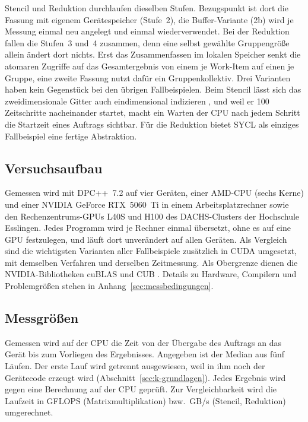 \documentclass[12pt,a4paper]{article}
\begin{document}
Stencil und Reduktion durchlaufen dieselben Stufen. Bezugspunkt ist dort die
Fassung mit eigenem Gerätespeicher (Stufe~2), die Buffer-Variante (2b) wird je
Messung einmal neu angelegt und einmal wiederverwendet. Bei der Reduktion fallen
die Stufen~3 und~4 zusammen, denn eine selbst gewählte Gruppengröße allein
ändert dort nichts. Erst das Zusammenfassen im lokalen Speicher senkt die
atomaren Zugriffe auf das Gesamtergebnis von einem je Work-Item auf einen je
Gruppe, eine zweite Fassung nutzt dafür ein Gruppenkollektiv. Drei Varianten
haben kein Gegenstück bei den übrigen Fallbeispielen. Beim Stencil lässt sich das
zweidimensionale Gitter auch eindimensional indizieren \cite{abram2025sycl}, und
weil er 100 Zeitschritte nacheinander startet, macht ein Warten der CPU nach
jedem Schritt die Startzeit eines Auftrags sichtbar. Für die Reduktion bietet
SYCL als einziges Fallbeispiel eine fertige Abstraktion.

\subsection{Versuchsaufbau}\label{sec:m-aufbau}

Gemessen wird mit DPC++~7.2 \cite{intel_llvm} auf vier Geräten, einer AMD-CPU
(sechs Kerne) und einer NVIDIA GeForce RTX~5060~Ti in einem Arbeitsplatzrechner
sowie den Rechenzentrums-GPUs L40S und H100 des DACHS-Clusters der Hochschule
Esslingen. Jedes Programm wird je Rechner einmal übersetzt, ohne es auf eine GPU
festzulegen, und läuft dort unverändert auf allen Geräten. Als Vergleich sind die
wichtigsten Varianten aller Fallbeispiele zusätzlich in CUDA umgesetzt, mit
demselben Verfahren und derselben Zeitmessung. Als Obergrenze dienen die
NVIDIA-Bibliotheken cuBLAS \cite{nvidia_cublas} und CUB \cite{nvidia_cub}.
Details zu Hardware, Compilern und Problemgrößen stehen in
Anhang~\ref{sec:messbedingungen}.

\subsection{Messgrößen}\label{sec:m-messgroessen}

Gemessen wird auf der CPU die Zeit von der Übergabe des Auftrags an das Gerät bis
zum Vorliegen des Ergebnisses. Angegeben ist der Median aus fünf Läufen. Der erste
Lauf wird getrennt ausgewiesen, weil in ihm noch der Gerätecode erzeugt wird
(Abschnitt~\ref{sec:k-grundlagen}). Jedes Ergebnis wird gegen eine Berechnung auf
der CPU geprüft. Zur Vergleichbarkeit wird die Laufzeit in GFLOPS
(Matrixmultiplikation) bzw.\ GB/s (Stencil, Reduktion) umgerechnet.
\end{document}
